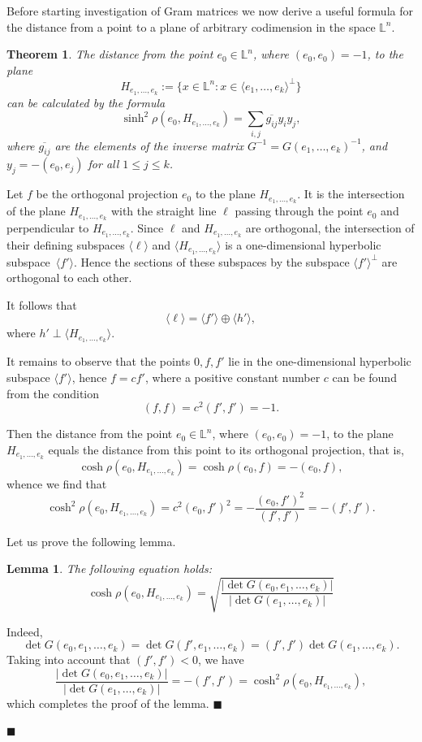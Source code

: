 \documentclass[14pt]{article}
\newtheorem{theorem}{\indent Theorem}[section]
\newtheorem{lemma}{\indent Lemma}[section]
\newenvironment{proof}                    
       {\par\indent{\bf Proof. }} 
	        {\hfill $\scriptstyle\blacksquare$}
\begin{document}
Before starting investigation of Gram matrices we now derive a useful
formula for the distance from a point to a plane of arbitrary codimension
in the space $\mathbb{L}^n$.

\begin{theorem}\label{formula-rasst}
The distance from the point $e_0 \in \mathbb{L}^n$, where $(e_0, e_0) = -1$,
to the plane
$$H_{e_1, \ldots, e_k} := \{x \in \mathbb{L}^n \colon x \in \langle e_1,
\ldots, e_k \rangle^{\perp}\}$$
can be calculated by the formula
$$
\sinh^2 \rho(e_0,  H_{e_1, \ldots, e_k}) =\sum_{i, j}\overline{g_{ij}} y_i y_j,
$$
where $\overline{g_{ij}}$ are the elements of the inverse matrix
$G^{-1} = G(e_1, \ldots, e_k)^{-1}$, and $y_j = - (e_0, e_j)$ for all $1 \le j \le k$.
\end{theorem}
\begin{proof}
Let $f$ be the orthogonal projection $e_0$ to the plane
$H_{e_1, \ldots, e_k}$.
It is the intersection of the
plane $H_{e_1, \ldots, e_k}$ with the straight
line $\ell$ passing through the point $e_0$ and perpendicular to $H_{e_1, \ldots, e_k}$.
Since $\ell$ and $H_{e_1, \ldots, e_k}$ are orthogonal,  the intersection of
their defining subspaces
$\langle \ell \rangle$ and $\langle H_{e_1, \ldots, e_k} \rangle$
is a one-dimensional hyperbolic subspace~$\langle f' \rangle$. Hence the sections of
these subspaces by the subspace $\langle f' \rangle^{\perp}$
are orthogonal to each other.

It follows that
$$
\langle \ell \rangle = \langle f' \rangle \oplus \langle h' \rangle,
$$
where $h' \perp \langle H_{e_1, \ldots, e_k} \rangle$.

It remains to observe that the points $0, f, f '$ lie in the one-dimensional
hyperbolic subspace
$\langle f' \rangle$, hence $f = c f'$, where a positive
constant number $c$ can be found from the condition
$$(f, f) = c^2 (f', f') = -1.$$


Then the distance from the point $e_0 \in \mathbb{L}^n$, where $(e_0, e_0) = -1$,
to the plane
$H_{e_1, \ldots, e_k}$  equals the distance from this point
to its orthogonal projection, that is,
$$
\cosh \rho (e_0,  H_{e_1, \ldots, e_k}) = \cosh \rho (e_0, f) = - (e_0, f),
$$
whence we find that
$$
\cosh^2 \rho (e_0,  H_{e_1, \ldots, e_k}) = c^2 (e_0, f')^2
= -\dfrac{(e_0, f')^2}{(f', f')}
= -(f', f').
$$


Let us prove the following lemma.

\begin{lemma}
The following equation holds:
$$
\cosh \rho(e_0,  H_{e_1, \ldots, e_k}) = \sqrt{\dfrac{|\det
G(e_0, e_1, \ldots, e_k)|}{|\det G(e_1, \ldots,
e_k)|}}
$$
\end{lemma}
\begin{proof}
Indeed,
$$\det G(e_0, e_1, \ldots, e_k) = \det G(f', e_1, \ldots, e_k)
= (f', f') \det G(e_1, \ldots, e_k).
$$
Taking into account that $(f', f') < 0$, we have
$$
\dfrac{|\det G(e_0, e_1, \ldots, e_k)|}{|\det G(e_1, \ldots, e_k)|}
= -(f', f') =
\cosh^2 \rho (e_0, H_{e_1, \ldots, e_k}),
$$
which completes the proof of the lemma.
\end{proof}


\end{proof}
\end{document}
